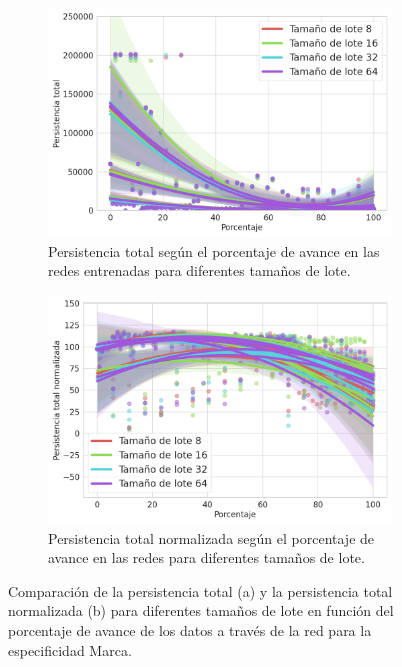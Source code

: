 \begin{figure}[H]
	\centering
	\begin{subfigure}{.5\textwidth}
		\centering
		\includegraphics[width=\linewidth]{img/m_batch.png}
		\caption{Persistencia total según el porcentaje de avance en las redes entrenadas para diferentes tamaños de lote.}
		\label{fig:m-homology-batch-1}
	\end{subfigure}%
	\begin{subfigure}{.5\textwidth}
		\centering
		\includegraphics[width=\linewidth]{img/m_batch_norm.png}
		\caption{Persistencia total normalizada según el porcentaje de avance en las redes para diferentes tamaños de lote.}
		\label{fig:m-homology-batch-2}
	\end{subfigure}
	\caption{Comparación de la persistencia total (a) y la persistencia total normalizada (b) para diferentes tamaños de lote en función del porcentaje de avance de los datos a través de la red para la especificidad Marca.}
	\label{fig:m-homology-batch}
\end{figure}

